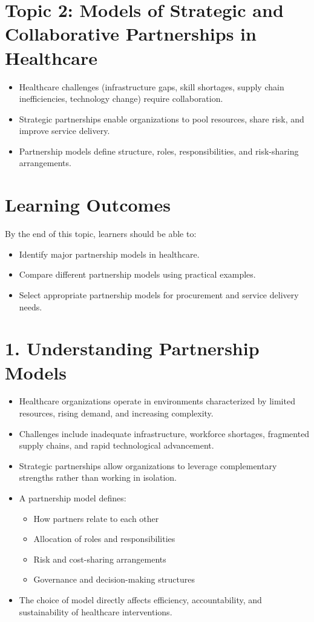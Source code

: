 \documentclass[10pt]{article}
\begin{document}
\section*{Topic 2: Models of Strategic and Collaborative Partnerships in Healthcare}
\begin{itemize}
  \item Healthcare challenges (infrastructure gaps, skill shortages, supply chain inefficiencies, technology change) require collaboration.
  \item Strategic partnerships enable organizations to pool resources, share risk, and improve service delivery.
  \item Partnership models define structure, roles, responsibilities, and risk-sharing arrangements.
\end{itemize}

\section*{Learning Outcomes}
By the end of this topic, learners should be able to:

\begin{itemize}
  \item Identify major partnership models in healthcare.
  \item Compare different partnership models using practical examples.
  \item Select appropriate partnership models for procurement and service delivery needs.
\end{itemize}

\section*{1. Understanding Partnership Models}
\begin{itemize}
  \item Healthcare organizations operate in environments characterized by limited resources, rising demand, and increasing complexity.
  \item Challenges include inadequate infrastructure, workforce shortages, fragmented supply chains, and rapid technological advancement.
  \item Strategic partnerships allow organizations to leverage complementary strengths rather than working in isolation.
  \item A partnership model defines:
  \begin{itemize}
  	\item How partners relate to each other
  	\item Allocation of roles and responsibilities
  	\item Risk and cost-sharing arrangements
  	\item Governance and decision-making structures
  \end{itemize}
  \item The choice of model directly affects efficiency, accountability, and sustainability of healthcare interventions.
\end{itemize}
\end{document}
